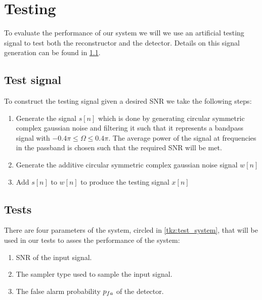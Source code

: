 \documentclass[a4paper, openany, oneside]{memoir}
\begin{document}
\section{Testing}
To evaluate the performance of our system we will we use an artificial testing signal to test both the reconstructor and the detector.
Details on this signal generation can be found in \cref{ssec:test_signal}.

\subsection{Test signal}\label{ssec:test_signal}
To construct the testing signal given a desired SNR we take the following steps:

\begin{enumerate}
	\item Generate the signal $s[n]$ which is done by generating circular symmetric complex gaussian noise and filtering it such that it represents a bandpass signal with $-0.4\pi \leq \Omega \leq 0.4\pi$. The average power of the signal at frequencies in the passband is chosen such
	that the required SNR will be met. 
	\item Generate the additive circular symmetric complex gaussian noise signal $w[n]$ 
	\item Add $s[n]$ to $w[n]$ to produce the testing signal $x[n]$
\end{enumerate}



\subsection{Tests}
There are four parameters of the system, circled in \cref{tkz:test_system}, that will be used in our tests to asses the performance of the system:
\begin{enumerate}
	\item SNR of the input signal.
	\item The sampler type used to sample the input signal.
	\item The false alarm probability $p\ss{fa}$ of the detector.
\end{enumerate}
\end{document}
